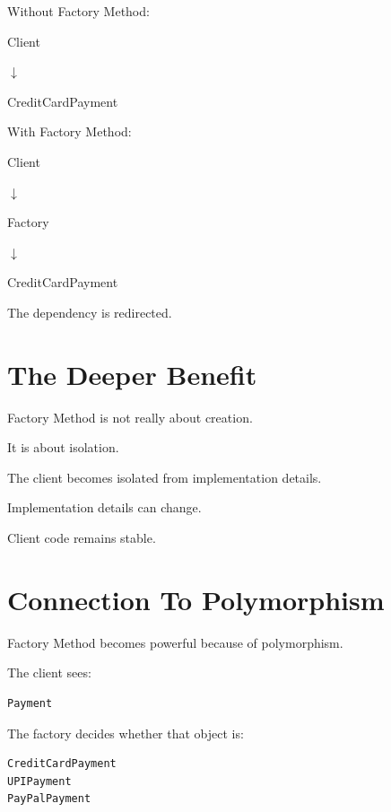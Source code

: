 \documentclass[11pt,a4paper]{book}
\begin{document}
\begin{mentalmodel}

Without Factory Method:

Client

$\downarrow$

CreditCardPayment

With Factory Method:

Client

$\downarrow$

Factory

$\downarrow$

CreditCardPayment

\end{mentalmodel}

The dependency is redirected.


\section{The Deeper Benefit}

\begin{idea}

Factory Method is not really about creation.

It is about isolation.

\end{idea}

The client becomes isolated from implementation
details.

Implementation details can change.

Client code remains stable.


\section{Connection To Polymorphism}

Factory Method becomes powerful because of
polymorphism.

The client sees:

\begin{verbatim}
Payment
\end{verbatim}

The factory decides whether that object is:

\begin{verbatim}
CreditCardPayment
UPIPayment
PayPalPayment
\end{verbatim}
\end{document}
